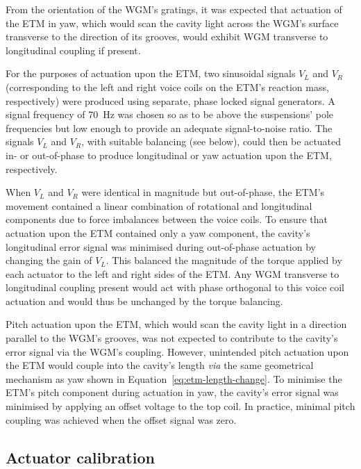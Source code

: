 From the orientation of the \gls{WGM}'s gratings, it was expected that actuation of the \gls{ETM} in yaw, which would scan the cavity light across the \gls{WGM}'s surface transverse to the direction of its grooves, would exhibit \gls{WGM} transverse to longitudinal coupling if present.

For the purposes of actuation upon the \gls{ETM}, two sinusoidal signals $V_L$ and $V_R$ (corresponding to the left and right voice coils on the \gls{ETM}'s reaction mass, respectively) were produced using separate, phase locked signal generators. A signal frequency of \SI{70}{\hertz} was chosen so as to be above the suspensions' pole frequencies but low enough to provide an adequate signal-to-noise ratio. The signals $V_L$ and $V_R$, with suitable balancing (see below), could then be actuated in- or out-of-phase to produce longitudinal or yaw actuation upon the \gls{ETM}, respectively.

When $V_L$ and $V_R$ were identical in magnitude but out-of-phase, the \gls{ETM}'s movement contained a linear combination of rotational and longitudinal components due to force imbalances between the voice coils. To ensure that actuation upon the \gls{ETM} contained only a yaw component, the cavity's longitudinal error signal was minimised during out-of-phase actuation by changing the gain of $V_L$. This balanced the magnitude of the torque applied by each actuator to the left and right sides of the \gls{ETM}. Any \gls{WGM} transverse to longitudinal coupling present would act with phase orthogonal to this voice coil actuation and would thus be unchanged by the torque balancing.

Pitch actuation upon the \gls{ETM}, which would scan the cavity light in a direction parallel to the \gls{WGM}'s grooves, was not expected to contribute to the cavity's error signal via the \gls{WGM}'s coupling. However, unintended pitch actuation upon the \gls{ETM} would couple into the cavity's length \emph{via} the same geometrical mechanism as yaw shown in Equation~\ref{eq:etm-length-change}. To minimise the \gls{ETM}'s pitch component during actuation in yaw, the cavity's error signal was minimised by applying an offset voltage to the top coil. In practice, minimal pitch coupling was achieved when the offset signal was zero.

\subsection{Actuator calibration}

